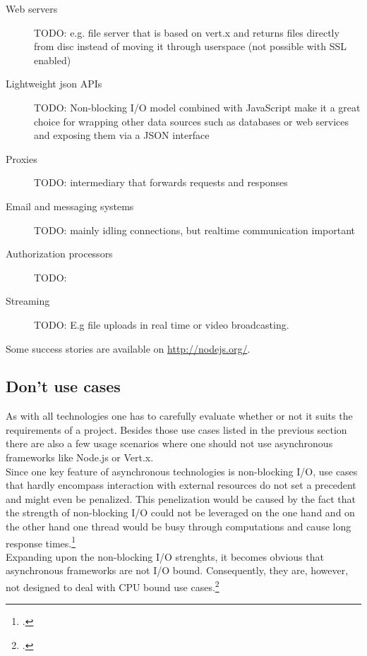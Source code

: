 \begin{description}
  \item[Web servers] TODO: e.g. file server that is based on vert.x and returns files directly from disc instead of
  	moving it through userspace (not possible with SSL enabled)
  \item[Lightweight json APIs] TODO: Non-blocking I/O model 
  		combined with JavaScript make it a great choice for
  		wrapping other data sources such as databases or web 
  		services and exposing them via a JSON interface%
  \item[Proxies] TODO: intermediary that forwards requests and responses
  \item[Email and messaging systems] TODO: mainly idling connections, but realtime communication important
  \item[Authorization processors] TODO:
  \item[Streaming] TODO: E.g file uploads in real time or video broadcasting.
\end{description}

Some success stories are available on \url{http://nodejs.org/}.

\subsection{Don't use cases}
\label{dont_use_cases}

As with all technologies one has to carefully evaluate whether or not it suits the
requirements of a project. Besides those use cases listed in the previous
section there are also a few usage scenarios where one should not use
asynchronous frameworks like Node.js or Vert.x.\\

Since one key feature of asynchronous technologies is non-blocking I/O, use cases that hardly encompass interaction with external resources do not set a precedent and might even be penalized. This penelization would be caused by the fact that the strength of non-blocking I/O could not be leveraged on the one hand and on the other hand one thread would be busy through computations and cause long response times.\footcite[Cf.][14]{Roden_2012}\\

Expanding upon the non-blocking I/O strenghts, it becomes obvious that asynchronous frameworks are not I/O bound. Consequently, they are, however, not designed to deal with CPU bound use cases.\footcite[Cf.][15]{Nguyen_2012}


